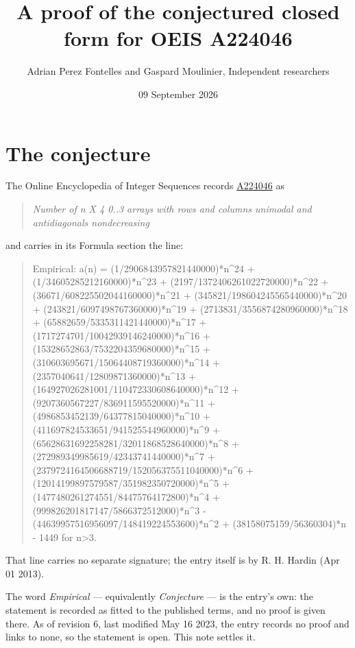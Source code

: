 \documentclass[11pt]{article}
\title{A proof of the conjectured closed form for OEIS A224046}
\author{Adrian Perez Fontelles and Gaspard Moulinier, Independent researchers}
\date{09 September 2026}
\theoremstyle{definition}
\begin{document}
\maketitle
\section{The conjecture}

The Online Encyclopedia of Integer Sequences records \href{https://oeis.org/A224046}{A224046} as

\begin{quote}\itshape Number of n X 4 0..3 arrays with rows and columns unimodal and antidiagonals nondecreasing\end{quote}

and carries in its Formula section the line:

\begin{quote}\ttfamily Empirical: a(n) = (1/2906843957821440000)*n\textasciicircum{}24 + (1/34605285212160000)*n\textasciicircum{}23 + (2197/1372406261022720000)*n\textasciicircum{}22 + (36671/608225502044160000)*n\textasciicircum{}21 + (345821/198604245565440000)*n\textasciicircum{}20 + (243821/6097498767360000)*n\textasciicircum{}19 + (2713831/3556874280960000)*n\textasciicircum{}18 + (65882659/5335311421440000)*n\textasciicircum{}17 + (1717274701/10042939146240000)*n\textasciicircum{}16 + (15328652863/7532204359680000)*n\textasciicircum{}15 + (310603695671/15064408719360000)*n\textasciicircum{}14 + (2357040641/12809871360000)*n\textasciicircum{}13 + (164927026281001/110472330608640000)*n\textasciicircum{}12 + (9207360567227/836911595520000)*n\textasciicircum{}11 + (4986853452139/64377815040000)*n\textasciicircum{}10 + (411697824533651/941525544960000)*n\textasciicircum{}9 + (65628631692258281/32011868528640000)*n\textasciicircum{}8 + (272989349985619/42343741440000)*n\textasciicircum{}7 + (2379724164506688719/152056375511040000)*n\textasciicircum{}6 + (12014199897579587/351982350720000)*n\textasciicircum{}5 + (1477480261274551/84475764172800)*n\textasciicircum{}4 + (999826201817147/5866372512000)*n\textasciicircum{}3 - (44639957516956097/148419224553600)*n\textasciicircum{}2 + (38158075159/56360304)*n - 1449 for n>3.\end{quote}

That line carries no separate signature; the entry itself is by R. H. Hardin (Apr 01 2013).

The word {\itshape Empirical} --- equivalently {\itshape Conjecture} --- is the entry's own: the statement is recorded as fitted to the published terms, and no proof is given there. As of revision 6, last modified May 16 2023, the entry records no proof and links to none, so the statement is open. This note settles it.
\end{document}
